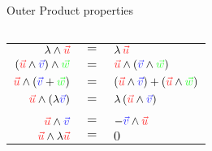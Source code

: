 \begin{frame}[t]{Outer Product properties}

    \begin{center}
    \end{center}

    \begin{columns}

        {
            \begin{tabular}{rcl}
                $\lambda \wedge \textcolor{u}{\vec{u}}$                                                & $=$ & $\lambda\,\textcolor{u}{\vec{u}}$                                                                                 \\
                $(\textcolor{u}{\vec{u}} \wedge \textcolor{v}{\vec{v}}) \wedge \textcolor{w}{\vec{w}}$ & $=$ & $\textcolor{u}{\vec{u}} \wedge (\textcolor{v}{\vec{v}} \wedge \textcolor{w}{\vec{w}})$                            \\
                $\textcolor{u}{\vec{u}} \wedge (\textcolor{v}{\vec{v}} + \textcolor{w}{\vec{w}})$      & $=$ & $(\textcolor{u}{\vec{u}} \wedge \textcolor{v}{\vec{v}}) + (\textcolor{u}{\vec{u}} \wedge \textcolor{w}{\vec{w}})$ \\
                $\textcolor{u}{\vec{u}} \wedge (\lambda \textcolor{v}{\vec{v}})$                       & $=$ & $\lambda\,(\textcolor{u}{\vec{u}} \wedge \textcolor{v}{\vec{v}})$                                                 \\
                \\
                $\textcolor{u}{\vec{u}} \wedge \textcolor{v}{\vec{v}}$                                 & $=$ & $-\textcolor{v}{\vec{v}} \wedge \textcolor{u}{\vec{u}}$                                                           \\
                $\textcolor{u}{\vec{u}} \wedge \lambda \textcolor{u}{\vec{u}}$                         & $=$ & $0$                                                                                                               \\
            \end{tabular}
        }

        \vspace{2em}


        \begin{minipage}[c][0.6\textheight][c]{\linewidth} %
            \centering
            \begin{tikzpicture}


\end{tikzpicture}
\end{minipage}
\end{columns}
\end{frame}
